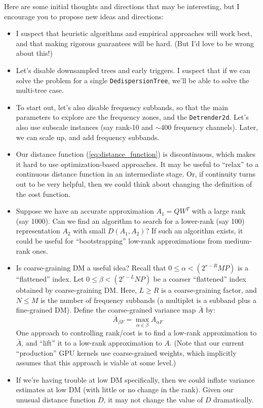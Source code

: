 \documentclass{article}
\numberwithin{equation}{section}   %
\begin{document}
Here are some initial thoughts and directions that may be interesting, but
I encourage you to propose new ideas and directions:

\begin{itemize}

\item I suspect that heuristic algorithms and empirical approaches will
 work best, and that making rigorous guarantees will be hard. (But I'd love to
 be wrong about this!)

\item Let's disable downsampled trees and early triggers. I suspect that
 if we can solve the problem for a single {\tt DedispersionTree}, we'll
 be able to solve the multi-tree case.

\item To start out, let's also disable frequency subbands, so that the
 main parameters to explore are the frequency zones, and the {\tt Detrender2d}.
 Let's also use subscale instances (say rank-10 and $\sim$400 frequency channels).
 Later, we can scale up, and add frequency subbands.

\item Our distance function (\ref{eq:distance_function}) is discontinuous,
 which makes it hard to use optimization-based approaches. It may be useful to
 ``relax'' to a continuous distance function in an intermediate stage. Or, if
 continuity turns out to be very helpful, then we could think about changing
 the definition of the cost function.

\item Suppose we have an accurate approximation $A_1 = Q W^T$ with
 a large rank (say 1000). Can we find an algorithm to search for a lower-rank
 (say 100) representation $A_2$ with small $D(A_1,A_2)$? If such an algorithm
 exists, it could be useful for ``bootstrapping'' low-rank approximations from
 medium-rank ones.

\item Is coarse-graining DM a useful idea? Recall that $0 \le \alpha < (2^{r-R}MP)$
is a ``flattened'' index. Let $0\le \beta < (2^{r-L}NP)$ be a coarser ``flattened''
index obtained by coarse-graining DM. Here, $L \ge R$ is a coarse-graining factor, 
and $N \le M$ is the number of frequency subbands (a multiplet is a subband plus
a fine-grained DM). Define the coarse-grained variance map $\bar A$ by:
\begin{equation}
\bar A_{\beta F} = \max_{\alpha\in\beta} A_{\alpha F}
\label{eq:coarse_graining}
\end{equation}
One approach to controlling rank/cost is to find a low-rank approximation to $\bar A$, 
and ``lift'' it to a low-rank approximation to $A$. (Note that our current ``production''
GPU kernels use coarse-grained weights, which implicitly assumes that this approach is
viable at some level.)

\item If we're having trouble at low DM specifically, then we could inflate variance
estimates at low DM (with little or no change in the rank). Given our unusual distance
function $D$, it may not change the value of $D$ dramatically.

\end{itemize}
\end{document}
